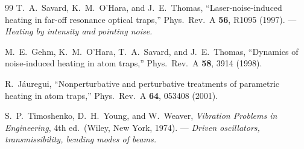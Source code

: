 \documentclass[11pt,a4paper]{article}
\begin{document}
\begin{thebibliography}{99}
 T.~A.~Savard, K.~M.~O'Hara, and J.~E.~Thomas, ``Laser-noise-induced heating in far-off resonance optical traps,'' Phys.\ Rev.\ A \textbf{56}, R1095 (1997). --- \emph{Heating by intensity and pointing noise.}

 M.~E.~Gehm, K.~M.~O'Hara, T.~A.~Savard, and J.~E.~Thomas, ``Dynamics of noise-induced heating in atom traps,'' Phys.\ Rev.\ A \textbf{58}, 3914 (1998).

 R.~Jáuregui, ``Nonperturbative and perturbative treatments of parametric heating in atom traps,'' Phys.\ Rev.\ A \textbf{64}, 053408 (2001).

 S.~P.~Timoshenko, D.~H.~Young, and W.~Weaver, \emph{Vibration Problems in Engineering}, 4th ed.\ (Wiley, New York, 1974). --- \emph{Driven oscillators, transmissibility, bending modes of beams.}

\end{thebibliography}
\end{document}
